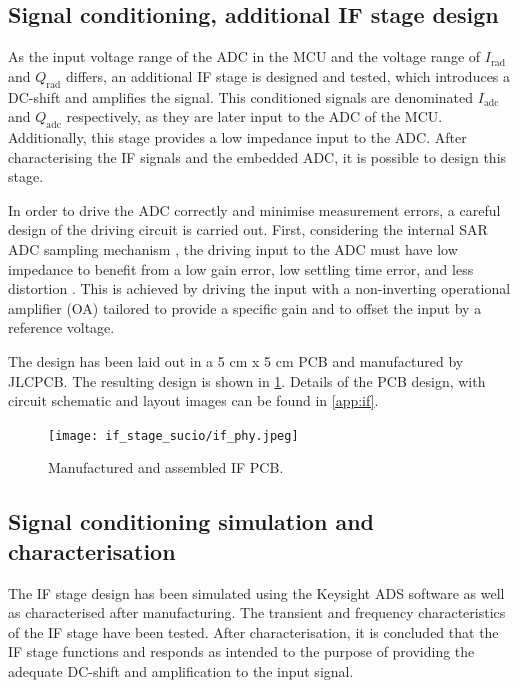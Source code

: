 \subsection{Signal conditioning, additional IF stage design} \label{sec:signal-conditioning-additional-if-stage-design}

As the input voltage range of the ADC in the MCU and the voltage range of $I_\mathrm{rad}$ and $Q_\mathrm{rad}$ differs, an additional IF stage is designed and tested, which introduces a DC-shift and amplifies the signal. This conditioned signals are denominated $I_\mathrm{adc}$ and $Q_\mathrm{adc}$ respectively, as they are later input to the ADC of the MCU. Additionally, this stage provides a low impedance input to the ADC. After characterising the IF signals and the embedded ADC, it is possible to design this stage.

In order to drive the ADC correctly and minimise measurement errors, a careful design of the driving circuit is carried out. First, considering the internal SAR ADC sampling mechanism \cite[pp.~356,~363]{STMicroelectronics2022a}, the driving input to the ADC must have low impedance to benefit from a low gain error, low settling time error, and less distortion \cite{Franco2014}. This is achieved by driving the input with a non-inverting operational amplifier (OA) tailored to provide a specific gain and to offset the input by a reference voltage.

The design has been laid out in a 5 cm x 5 cm PCB and manufactured by JLCPCB. The resulting design is shown in \cref{fig:if_phy}. Details of the PCB design, with circuit schematic and layout images can be found in \cref{app:if}.

\begin{figure}[htb]
	\centering
	\texttt{[image: if\_stage\_sucio/if\_phy.jpeg]}
	\caption{Manufactured and assembled IF PCB.}
	\label{fig:if_phy}
\end{figure}

\subsection{Signal conditioning simulation and characterisation}

The IF stage design has been simulated using the Keysight ADS software as well as characterised after manufacturing. The transient and frequency characteristics of the IF stage have been tested. After characterisation, it is concluded that the IF stage functions and responds as intended to the purpose of providing the adequate DC-shift and amplification to the input signal.

